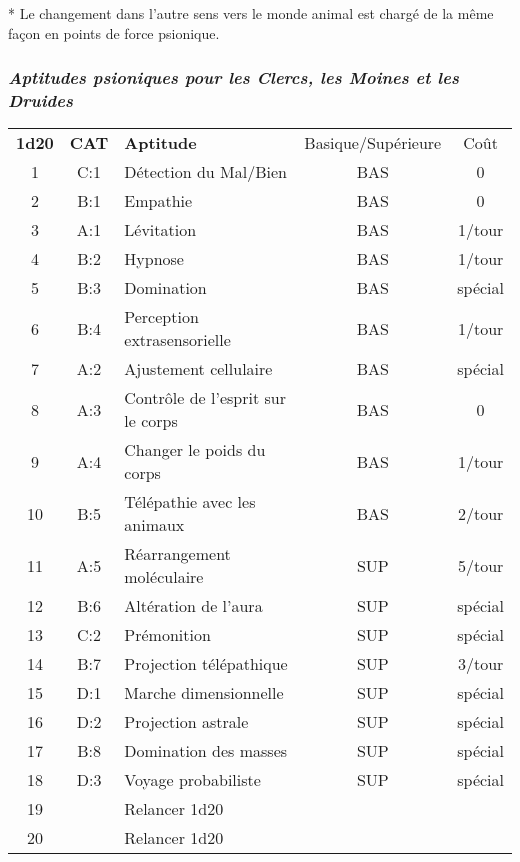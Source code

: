 \bigskip

* Le changement dans l'autre sens vers le monde animal est chargé de la même façon en points de force psionique.



\newpage
\subsubsection*{\textit{Aptitudes psioniques pour les Clercs, les Moines et les Druides}}

\bigskip

\begin{tabular}{cclcc}
\textbf{1d20} & \textbf{CAT} & \textbf{Aptitude}& Basique/Supérieure & Coût \\
1   & C:1 & Détection du Mal/Bien       & BAS & 0 \\
2   & B:1 & Empathie                    & BAS & 0 \\
3   & A:1 & Lévitation                  & BAS & 1/tour \\
4   & B:2 & Hypnose                     & BAS & 1/tour \\
5   & B:3 & Domination                  & BAS & spécial \\
6   & B:4 & Perception extrasensorielle & BAS & 1/tour \\
7   & A:2 & Ajustement cellulaire       & BAS & spécial \\
8   & A:3 & Contrôle de l'esprit sur le corps & BAS & 0 \\
9   & A:4 & Changer le poids du corps   & BAS & 1/tour \\
10  & B:5 & Télépathie avec les animaux & BAS & 2/tour \\
11  & A:5 & Réarrangement moléculaire   & SUP & 5/tour  \\
12  & B:6 & Altération de l'aura        & SUP & spécial  \\
13  & C:2 & Prémonition                 & SUP & spécial  \\
14  & B:7 & Projection télépathique     & SUP & 3/tour  \\
15  & D:1 & Marche dimensionnelle       & SUP & spécial  \\
16  & D:2 & Projection astrale          & SUP & spécial  \\
17  & B:8 & Domination des masses       & SUP & spécial  \\
18  & D:3 & Voyage probabiliste         & SUP & spécial  \\
19  &     & Relancer 1d20               & & \\
20  &     & Relancer 1d20               & & \\
\end{tabular}

